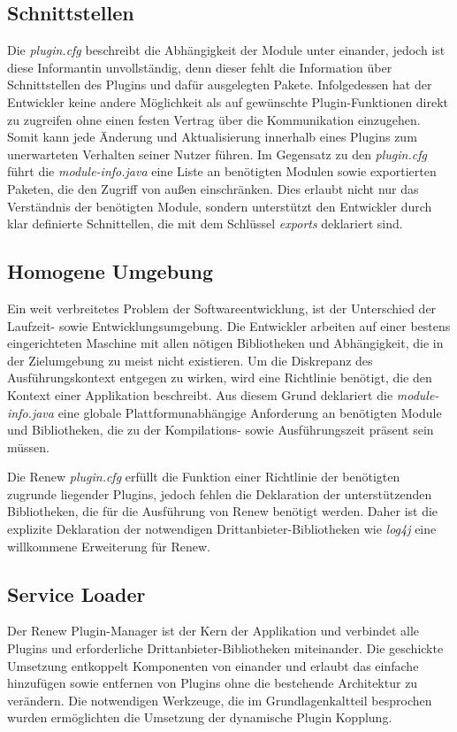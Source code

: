 \subsection{Schnittstellen}
Die \textit{plugin.cfg} beschreibt die Abhängigkeit der Module unter einander, jedoch ist diese Informantin unvollständig, denn dieser fehlt die Information über Schnittstellen des Plugins und dafür ausgelegten Pakete. Infolgedessen hat der Entwickler keine andere Möglichkeit als auf gewünschte Plugin-Funktionen direkt zu zugreifen ohne einen festen Vertrag über die Kommunikation einzugehen. Somit kann jede Änderung und Aktualisierung innerhalb eines Plugins zum unerwarteten Verhalten seiner Nutzer führen. \newline
Im Gegensatz zu den \textit{plugin.cfg} führt die \textit{module-info.java} eine Liste an benötigten Modulen sowie exportierten Paketen, die den Zugriff von außen einschränken. Dies erlaubt nicht nur das Verständnis der benötigten Module, sondern unterstützt den Entwickler durch klar definierte Schnittellen, die mit dem Schlüssel \textit{exports} deklariert sind.

\subsection{Homogene Umgebung}
Ein weit verbreitetes Problem der Softwareentwicklung, ist der Unterschied der Laufzeit- sowie Entwicklungsumgebung. Die Entwickler arbeiten auf einer bestens eingerichteten Maschine mit allen nötigen Bibliotheken und Abhängigkeit, die in der Zielumgebung zu meist nicht existieren. Um die Diskrepanz des Ausführungskontext entgegen zu wirken, wird eine Richtlinie benötigt, die den Kontext einer Applikation beschreibt. Aus diesem Grund deklariert die \textit{module-info.java} eine globale Plattformunabhängige Anforderung an benötigten Module und Bibliotheken, die zu der Kompilations- sowie Ausführungszeit präsent sein müssen.
\bigbreak

Die Renew \textit{plugin.cfg} erfüllt die Funktion einer Richtlinie der benötigten zugrunde liegender Plugins, jedoch fehlen die Deklaration der unterstützenden Bibliotheken, die für die Ausführung von Renew benötigt werden. Daher ist die explizite Deklaration der notwendigen Drittanbieter-Bibliotheken wie \textit{log4j} eine willkommene Erweiterung für Renew. 

\subsection{Service Loader} 
Der Renew Plugin-Manager ist der Kern der Applikation und verbindet alle Plugins und erforderliche Drittanbieter-Bibliotheken miteinander. Die geschickte Umsetzung entkoppelt Komponenten von einander und erlaubt das einfache hinzufügen sowie entfernen von Plugins ohne die bestehende Architektur zu verändern. Die notwendigen Werkzeuge, die im Grundlagenkaltteil besprochen wurden ermöglichten die Umsetzung der dynamische Plugin Kopplung. 
\bigbreak

